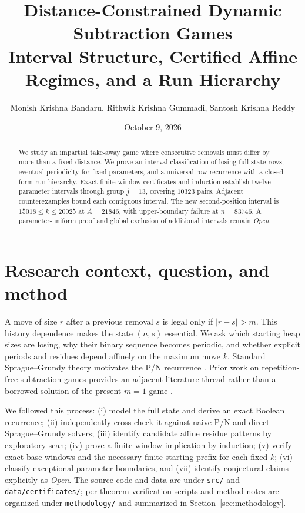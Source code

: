 \documentclass[11pt]{article}
\title{\textbf{Distance-Constrained Dynamic Subtraction Games}\\[0.4em]
\large Interval Structure, Certified Affine Regimes, and a Run Hierarchy}
\author{Monish Krishna Bandaru, Rithwik Krishna Gummadi, Santosh Krishna Reddy}
\date{October 9, 2026}
\begin{document}
\maketitle
\begin{abstract}
We study an impartial take-away game where consecutive removals must differ by more than a fixed distance. We prove an interval classification of losing full-state rows, eventual periodicity for fixed parameters, and a universal row recurrence with a closed-form run hierarchy. Exact finite-window certificates and induction establish twelve parameter intervals through group $j=13$, covering $10323$ pairs. Adjacent counterexamples bound each contiguous interval. The new second-position interval is $15018\le k\le20025$ at $A=21846$, with upper-boundary failure at $n=83746$. A parameter-uniform proof and global exclusion of additional intervals remain \emph{Open}.
\end{abstract}
\tableofcontents
\section{Research context, question, and method}
A move of size $r$ after a previous removal $s$ is legal only if $|r-s|>m$. This history dependence makes the state $(n,s)$ essential. We ask which starting heap sizes are losing, why their binary sequence becomes periodic, and whether explicit periods and residues depend affinely on the maximum move $k$. Standard Sprague--Grundy theory motivates the P/N recurrence \cite{sprague1935,grundy1939,winningways2001}. Prior work on repetition-free subtraction games provides an adjacent literature thread rather than a borrowed solution of the present $m=1$ game \cite{gurvich2012}.

We followed this process: (i) model the full state and derive an exact Boolean recurrence; (ii) independently cross-check it against naive P/N and direct Sprague--Grundy solvers; (iii) identify candidate affine residue patterns by exploratory scan; (iv) prove a finite-window implication by induction; (v) verify exact base windows and the necessary finite starting prefix for each fixed $k$; (vi) classify exceptional parameter boundaries, and (vii) identify conjectural claims explicitly as \emph{Open}. The source code and data are under \texttt{src/} and \texttt{data/certificates/}; per-theorem verification scripts and method notes are organized under \texttt{methodology/} and summarized in Section~\ref{sec:methodology}.



\end{document}
